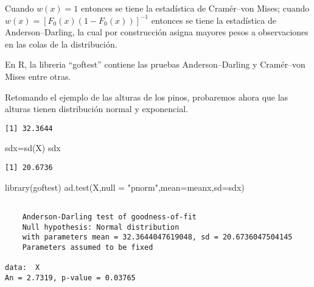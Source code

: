 \documentclass[
  a4paper,
  oneside,
  openany]{book}
\newenvironment{Shaded}{\begin{snugshade}}{\end{snugshade}}
\newcommand{\AttributeTok}[1]{\textcolor[rgb]{0.77,0.63,0.00}{#1}}
\newcommand{\FunctionTok}[1]{\textcolor[rgb]{0.00,0.00,0.00}{#1}}
\newcommand{\NormalTok}[1]{#1}
\newcommand{\OtherTok}[1]{\textcolor[rgb]{0.56,0.35,0.01}{#1}}
\newcommand{\SpecialCharTok}[1]{\textcolor[rgb]{0.00,0.00,0.00}{#1}}
\newcommand{\StringTok}[1]{\textcolor[rgb]{0.31,0.60,0.02}{#1}}
\begin{document}
Cuando \(w(x)=1\) entonces se tiene la estadística de Cramér--von Mises; cuando \(w(x)=[F_0(x)(1-F_0(x))]^{-1}\) entonces se tiene la estadística de Anderson--Darling, la cual por construcción asigna mayores pesos a observaciones en las colas de la distribución.

En R, la libreria ``goftest'' contiene las pruebas Anderson--Darling y Cramér--von Mises entre otras.

Retomando el ejemplo de las alturas de los pinos, probaremos ahora que las alturas tienen distribución normal y exponencial.

\begin{Shaded}
\end{Shaded}

\begin{verbatim}
[1] 32.3644
\end{verbatim}

\begin{Shaded}
\begin{Highlighting}[]
\NormalTok{sdx}\OtherTok{=}\FunctionTok{sd}\NormalTok{(X)}
\NormalTok{sdx}
\end{Highlighting}
\end{Shaded}

\begin{verbatim}
[1] 20.6736
\end{verbatim}

\begin{Shaded}
\begin{Highlighting}[]
\FunctionTok{library}\NormalTok{(goftest)}
\FunctionTok{ad.test}\NormalTok{(X,}\AttributeTok{null =} \StringTok{"pnorm"}\NormalTok{,}\AttributeTok{mean=}\NormalTok{meanx,}\AttributeTok{sd=}\NormalTok{sdx)}
\end{Highlighting}
\end{Shaded}

\begin{verbatim}

    Anderson-Darling test of goodness-of-fit
    Null hypothesis: Normal distribution
    with parameters mean = 32.3644047619048, sd = 20.6736047504145
    Parameters assumed to be fixed

data:  X
An = 2.7319, p-value = 0.03765
\end{verbatim}
\end{document}
